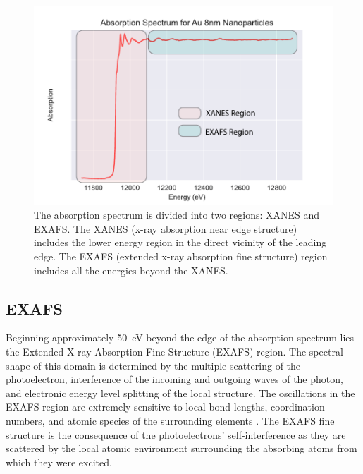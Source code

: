 \begin{figure}
    \centering
    \includegraphics[width=.75\linewidth]{Chapters/Figures/absorption-spectra-example.pdf}
    \caption[XANES vs. EXAFS Regions]{The absorption spectrum is divided into two regions: XANES and EXAFS. The XANES (x-ray absorption near edge structure) includes the lower energy region in the direct vicinity of the leading edge. The EXAFS (extended x-ray absorption fine structure) region includes all the energies beyond the XANES.}
    \label{XAFS-example-spectrum}
\end{figure}

\subsection{EXAFS}
Beginning approximately 50~eV beyond the edge of the absorption spectrum lies the Extended X-ray Absorption Fine Structure (EXAFS) region. The spectral shape of this domain is determined by the multiple scattering of the photoelectron, interference of the incoming and outgoing waves of the photon, and electronic energy level splitting of the local structure. The oscillations in the EXAFS region are extremely sensitive to local bond lengths, coordination numbers, and atomic species of the surrounding elements \cite{exafsbook}. The EXAFS fine structure is the consequence of the photoelectrons' self-interference as they are scattered by the local atomic environment surrounding the absorbing atoms from which they were excited.


